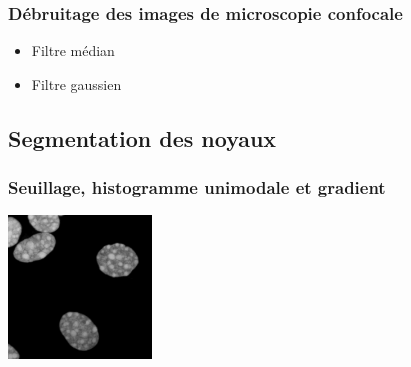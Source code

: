 \documentclass{beamer}
\begin{document}
    \frame
    {
      \frametitle{Débruitage des images de microscopie confocale}
      \begin{itemize}
        \item Filtre médian
        \item Filtre gaussien
      \end{itemize}
    }
    
%     
%     
    
  \subsection{Segmentation des noyaux}
    
    \frame
    {
      \frametitle{Seuillage, histogramme unimodale et gradient}
      \begin{center}
        \includegraphics[height=3.8cm]{noyaux.png} %
        \\ %
       \end{center}
   }
\end{document}

